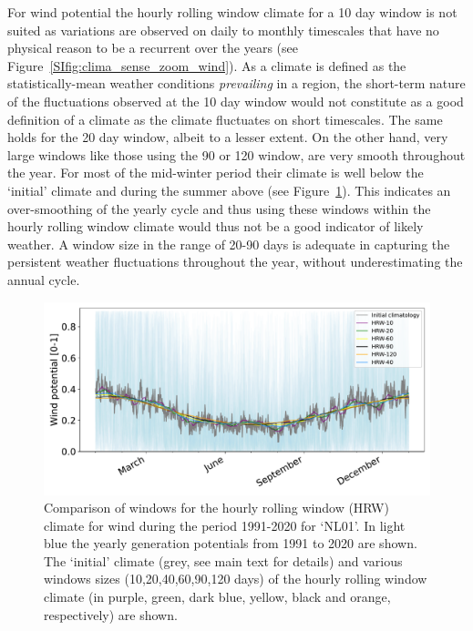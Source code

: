 \documentclass[12pt]{iopart}
\begin{document}
For wind potential the hourly rolling window climate for a 10 day window is not suited as variations are observed on daily to monthly timescales that have no physical reason to be a recurrent over the years (see Figure~\ref{SIfig:clima_sense_zoom_wind}). As a climate is defined as the statistically-mean weather conditions \emph{prevailing} in a region, the short-term nature of the fluctuations observed at the 10 day window would not constitute as a good definition of a climate as the climate fluctuates on short timescales. The same holds for the 20 day window, albeit to a lesser extent. On the other hand, very large windows like those using the 90 or 120 window, are very smooth throughout the year. For most of the mid-winter period their climate is well below the `initial' climate and during the summer above (see Figure~\ref{SIfig:clima_sense_wind}). This indicates an over-smoothing of the yearly cycle and thus using these windows within the hourly rolling window climate would thus not be a good indicator of likely weather. A window size in the range of 20-90 days is adequate in capturing the persistent weather fluctuations throughout the year, without underestimating the annual cycle.

\begin{figure}[hb]
    \centering
    \includegraphics[width=\textwidth]{Figures_SI/Climatology_sensitivity_wind.pdf}
    \caption{Comparison of windows for the hourly rolling window (HRW) climate for wind during the period 1991-2020 for `NL01'. In light blue the yearly generation potentials from 1991 to 2020 are shown. The `initial' climate (grey, see main text for details) and various windows sizes (10,20,40,60,90,120 days) of the hourly rolling window climate (in purple, green, dark blue, yellow, black and orange, respectively) are shown.}
    \label{SIfig:clima_sense_wind}
\end{figure}
\end{document}
